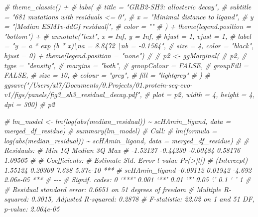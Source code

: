 \documentclass[
]{article}
\newenvironment{Shaded}{\begin{snugshade}}{\end{snugshade}}
\newcommand{\CommentTok}[1]{\textcolor[rgb]{0.56,0.35,0.01}{\textit{#1}}}
\begin{document}
\begin{Shaded}
\begin{Highlighting}[]
\CommentTok{\#   theme\_classic() +}
\CommentTok{\#   labs(}
\CommentTok{\#     title = "GRB2{-}SH3: allosteric decay",}
\CommentTok{\#     subtitle = "681 mutations with residuals \textless{}= 0",}
\CommentTok{\#     x = "Minimal distance to ligand",}
\CommentTok{\#     y = "|Median ESM1v{-}ddGf residual|",}
\CommentTok{\#     color = ""}
\CommentTok{\#   )  + theme(legend.position = "bottom") +}
\CommentTok{\#     annotate("text",  x = Inf, y = Inf,}
\CommentTok{\#              hjust = 1, vjust = 1,}
\CommentTok{\#            label = "y = a * exp (b * x)\textbackslash{}na = 8.8472  \textbackslash{}nb = {-}0.1564",}
\CommentTok{\#            size = 4, color = "black", hjust = 0) + theme(legend.position = "none")}
\CommentTok{\# }
\CommentTok{\# p2 \textless{}{-} ggMarginal(}
\CommentTok{\#   p2,}
\CommentTok{\#   type = "density",}
\CommentTok{\#   margins = "both",}
\CommentTok{\#   groupColour = FALSE,}
\CommentTok{\#   groupFill = FALSE,}
\CommentTok{\#   size = 10,}
\CommentTok{\#   colour = "grey",}
\CommentTok{\#   fill = "lightgrey"}
\CommentTok{\# )}
\CommentTok{\# ggsave("/Users/xl7/Documents/0.Projects/01.protein{-}seq{-}evo{-}v1/figs/panels/fig3\_sh3\_residual\_decay.pdf", }
\CommentTok{\#        plot = p2, width = 4, height = 4, dpi = 300)}
\CommentTok{\# p2}
\end{Highlighting}
\end{Shaded}

\begin{Shaded}
\begin{Highlighting}[]
\CommentTok{\# lm\_model \textless{}{-} lm(log(abs(median\_residual)) \textasciitilde{} scHAmin\_ligand, data = merged\_df\_residue)}
\CommentTok{\# summary(lm\_model)}
\CommentTok{\# Call:}
\CommentTok{\# lm(formula = log(abs(median\_residual)) \textasciitilde{} scHAmin\_ligand, data = merged\_df\_residue)}
\CommentTok{\# }
\CommentTok{\# Residuals:}
\CommentTok{\#      Min       1Q   Median       3Q      Max }
\CommentTok{\# {-}1.52127 {-}0.44230 {-}0.00484  0.58176  1.09505 }
\CommentTok{\# }
\CommentTok{\# Coefficients:}
\CommentTok{\#                Estimate Std. Error t value Pr(\textgreater{}|t|)    }
\CommentTok{\# (Intercept)     1.55124    0.20309   7.638 5.37e{-}10 ***}
\CommentTok{\# scHAmin\_ligand {-}0.09112    0.01942  {-}4.692 2.06e{-}05 ***}
\CommentTok{\# {-}{-}{-}}
\CommentTok{\# Signif. codes:  0 ‘***’ 0.001 ‘**’ 0.01 ‘*’ 0.05 ‘.’ 0.1 ‘ ’ 1}
\CommentTok{\# }
\CommentTok{\# Residual standard error: 0.6651 on 51 degrees of freedom}
\CommentTok{\# Multiple R{-}squared:  0.3015,  Adjusted R{-}squared:  0.2878 }
\CommentTok{\# F{-}statistic: 22.02 on 1 and 51 DF,  p{-}value: 2.064e{-}05}
\end{Highlighting}
\end{Shaded}
\end{document}

